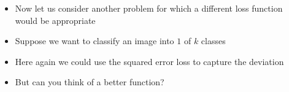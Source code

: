 \begin{frame}
  \begin{columns}
    \begin{overlayarea}{\textwidth}{\textheight}
      \vspace{0.3cm}
      \makebox[\textwidth][c]{\usebox{\nnfruitclassexamplecontent}}
    \end{overlayarea}

    \begin{overlayarea}{\textwidth}{\textheight}
      \begin{itemize}[<+->]
      \justifying
        \item Now let us consider another problem for which a different loss function would be appropriate
        \item Suppose we want to classify an image into $1$ of $k$ classes
        \item Here again we could use the squared error loss to capture the deviation
        \item But can you think of a better function?
      \end{itemize}
    \end{overlayarea}
  \end{columns}
\end{frame}

